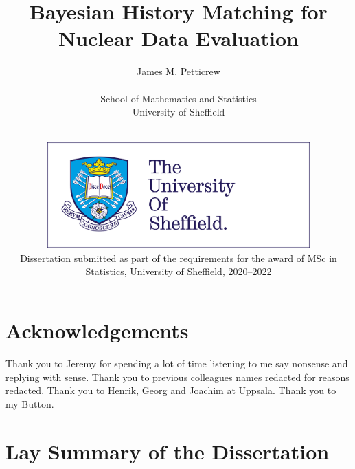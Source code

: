\documentclass[
  12pt,
  a4paper,
  twoside]{book}
\author{}
\date{\vspace{-2.5em}}
\begin{document}


\title{Bayesian History Matching for Nuclear Data Evaluation}
\author{James M. Petticrew
\\$~$\vspace{0.5in}\\
School of Mathematics and Statistics\\
University of Sheffield}

\date{$~$\vspace{1.5in}\\
\includegraphics[width=4in]{figures/logo.jpg}\\
\vfill Dissertation submitted as part of the requirements for the award of MSc in Statistics, University of Sheffield, 2020--2022\\
}

\maketitle

\hypertarget{acknowledgements}{%
\chapter*{Acknowledgements}\label{acknowledgements}}

Thank you to Jeremy for spending a lot of time listening to me say nonsense and replying with sense. Thank you to previous colleagues names redacted for reasons redacted. Thank you to Henrik, Georg and Joachim at Uppsala. Thank you to my Button.

\hypertarget{lay-summary-of-the-dissertation}{%
\chapter*{Lay Summary of the Dissertation}\label{lay-summary-of-the-dissertation}}
\end{document}
